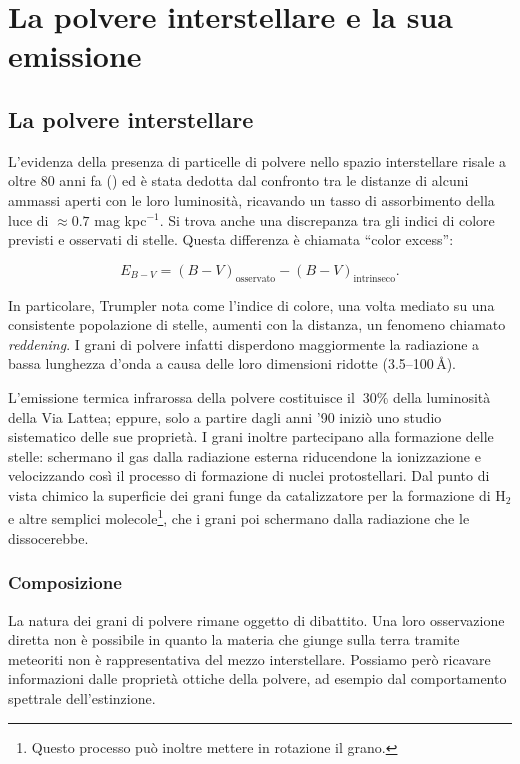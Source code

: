 \chapter{La polvere interstellare e la sua emissione}

\section{La polvere interstellare}

L'evidenza della presenza di particelle di polvere nello spazio interstellare risale a oltre 80 anni fa (\cite{Trumpler}) ed è stata dedotta dal confronto tra le distanze di alcuni ammassi aperti con le loro luminosità, ricavando un tasso di assorbimento della luce di $\approx0.7$ mag kpc$^{-1}$. Si trova anche una discrepanza tra gli indici di colore previsti e osservati di stelle. Questa differenza è chiamata ``color excess'':

\begin{equation}
E_{B-V}=(B-V)_{\text{osservato}}-(B-V)_{\text{intrinseco}}.
\end{equation}

In particolare, Trumpler nota come l'indice di colore, una volta mediato su una consistente popolazione di stelle, aumenti con la distanza, un fenomeno chiamato \textit{reddening}. I grani di polvere infatti disperdono maggiormente la radiazione a bassa lunghezza d'onda a causa delle loro dimensioni ridotte (3.5--100\,\AA{}).

L'emissione termica infrarossa della polvere costituisce il $~30\%$ della luminosità della Via Lattea; eppure, solo a partire dagli anni '90 iniziò uno studio sistematico delle sue proprietà. I grani inoltre partecipano alla formazione delle stelle: schermano il gas dalla radiazione esterna riducendone la ionizzazione e velocizzando così il processo di formazione di nuclei protostellari.
Dal punto di vista chimico la superficie dei grani funge da catalizzatore per la formazione di H$_{2}$ e altre semplici molecole\footnote{Questo processo può inoltre mettere in rotazione il grano.}, che i grani poi schermano dalla radiazione che le dissocerebbe.

\subsection{Composizione}
La natura dei grani di polvere rimane oggetto di dibattito. Una loro osservazione diretta non è possibile in quanto la materia che giunge sulla terra tramite meteoriti non è rappresentativa del mezzo interstellare. Possiamo però ricavare informazioni dalle proprietà ottiche della polvere, ad esempio dal comportamento spettrale dell'estinzione.

